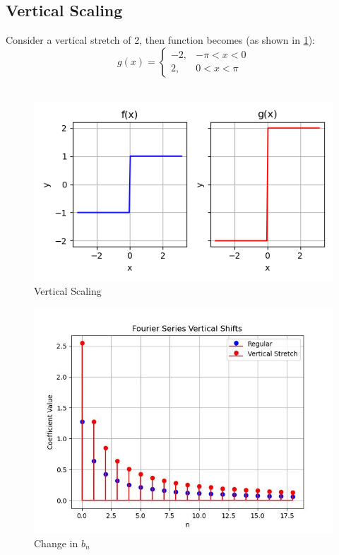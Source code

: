 \documentclass{article}
\begin{document}
\subsection{Vertical Scaling}
Consider a vertical stretch of 2, then function becomes (as shown in \ref{fig3}): 
\begin{equation}
g(x) = 
\begin{cases} 
-2, & -\pi < x < 0 \\
2, & 0 < x < \pi
\end{cases}
\end{equation}\\
\begin{figure}
    \centering
    \includegraphics[width=\textwidth]{vertical_scaling.png}
    \caption{Vertical Scaling}
    \label{fig3}
\end{figure}
\begin{figure}
    \centering
    \includegraphics[width=\textwidth]{vertical_stem_stretch.jpg}
    \caption{Change in $b_n$}
    \label{Figure 4}
\end{figure}
\end{document}
